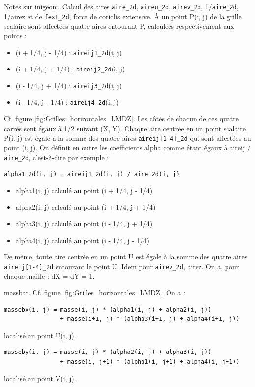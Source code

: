 \documentclass[a4paper,english,french]{article}
\begin{document}
Notes sur inigeom. Calcul des aires \verb+aire_2d+, \verb+aireu_2d+,
\verb+airev_2d+, 1/\verb+aire_2d+, 1/airez et de \verb+fext_2d+, force
de coriolis extensive. À un point P(i, j) de la grille scalaire sont
affectées quatre aires entourant P, calculées respectivement aux
points :
\begin{itemize}
\item (i + 1/4, j - 1/4) : \verb+aireij1_2d+(i, j)
\item (i + 1/4, j + 1/4) : \verb+aireij2_2d+(i, j)
\item (i - 1/4, j + 1/4) : \verb+aireij3_2d+(i, j)
\item (i - 1/4, j - 1/4) : \verb+aireij4_2d+(i, j)
\end{itemize}
Cf. figure \ref{fig:Grilles_horizontales_LMDZ}. Les côtés de chacun de
ces quatre carrés sont égaux à 1/2 suivant (X, Y). Chaque aire centrée
en un point scalaire P(i, j) est égale à la somme des quatre aires
\verb+aireij[1-4]_2d+ qui sont affectées au point (i, j). On définit
en outre les coefficients alpha comme étant égaux à aireij /
\verb+aire_2d+, c'est-à-dire par exemple :
\begin{verbatim}
alpha1_2d(i, j) = aireij1_2d(i, j) / aire_2d(i, j)
\end{verbatim}
\begin{itemize}
\item alpha1(i, j) calculé au point (i + 1/4, j - 1/4)
\item alpha2(i, j) calculé au point (i + 1/4, j + 1/4)
\item alpha3(i, j) calculé au point (i - 1/4, j + 1/4)
\item alpha4(i, j) calculé au point (i - 1/4, j - 1/4)
\end{itemize}
De même, toute aire centrée en un point U est égale à la somme des
quatre aires \verb+aireij[1-4]_2d+ entourant le point U. Idem pour
\verb+airev_2d+, airez. On a, pour chaque maille : dX = dY = 1.

massbar. Cf. figure \ref{fig:Grilles_horizontales_LMDZ}. On a :
\begin{verbatim}
massebx(i, j) = masse(i, j) * (alpha1(i, j) + alpha2(i, j))
                + masse(i+1, j) * (alpha3(i+1, j) + alpha4(i+1, j))
\end{verbatim}
localisé au point U(i, j).

\begin{verbatim}
masseby(i, j) = masse(i, j) * (alpha2(i, j) + alpha3(i, j))
                + masse(i, j+1) * (alpha1(i, j+1) + alpha4(i, j+1))
\end{verbatim}
localisé au point V(i, j).
\end{document}
